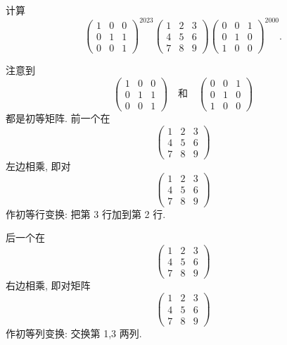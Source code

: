 \documentclass[../../main.tex]{subfiles}%
\begin{document}
\begin{example}
计算
\[
\begin{pmatrix} 
1 & 0 & 0 \\
0 & 1 & 1 \\
0 & 0 & 1 
\end{pmatrix}^{2023} 
\begin{pmatrix} 
1 & 2 & 3 \\
4 & 5 & 6 \\
7 & 8 & 9 
\end{pmatrix} 
\begin{pmatrix} 
0 & 0 & 1 \\
0 & 1 & 0 \\
1 & 0 & 0 
\end{pmatrix}^{2000}.
\]
\end{example}
\begin{solution}
注意到
\[
\begin{pmatrix} 
1 & 0 & 0 \\
0 & 1 & 1 \\
0 & 0 & 1 
\end{pmatrix}
\quad \text{和} \quad
\begin{pmatrix} 
0 & 0 & 1 \\
0 & 1 & 0 \\
1 & 0 & 0 
\end{pmatrix}
\]
都是初等矩阵. 前一个在
\[
\begin{pmatrix} 
1 & 2 & 3 \\
4 & 5 & 6 \\
7 & 8 & 9 
\end{pmatrix}
\]
左边相乘, 即对
\[
\begin{pmatrix} 
1 & 2 & 3 \\
4 & 5 & 6 \\
7 & 8 & 9 
\end{pmatrix}
\]
作初等行变换: 把第 3 行加到第 2 行.

后一个在
\[
\begin{pmatrix} 
1 & 2 & 3 \\
4 & 5 & 6 \\
7 & 8 & 9 
\end{pmatrix}
\]
右边相乘, 即对矩阵
\[
\begin{pmatrix} 
1 & 2 & 3 \\
4 & 5 & 6 \\
7 & 8 & 9 
\end{pmatrix}
\]
作初等列变换: 交换第 1,3 两列.


\end{solution}
\end{document}
